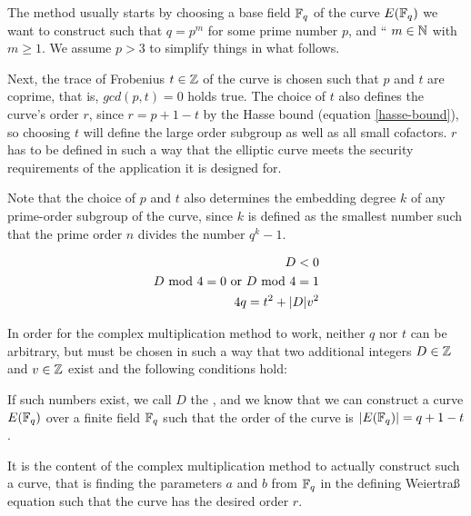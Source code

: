 
The method usually starts by choosing a base field $\mathbb{F}_{q}$ of the curve $E(\mathbb{F}_q)$ we want to construct such that $q = p^m$ for some prime number $p$, and  `` $m\in \mathbb{N}$ with $m\geq 1$. We assume $p>3$ to simplify things in what follows. 

Next, the trace of Frobenius $t\in \mathbb{Z}$ of the curve is chosen such that $p$ and $t$ are coprime, that is, $gcd(p,t)=0$ holds true. The choice of $t$ also defines the curve's order $r$, since $r=p+1-t$ by the Hasse bound (equation \ref{hasse-bound}), so choosing $t$ will define the large order subgroup as well as all small cofactors. $r$ has to be defined in such a way that the elliptic curve meets the security requirements of the application it is designed for. 

Note that the choice of $p$ and $t$ also determines the embedding degree $k$ of any prime-order subgroup of the curve, since $k$ is defined as the smallest number such that the prime order $n$ divides the number $q^k-1$.

\begin{equation}\label{eq:D-criteria}
\begin{split}
D<0\\
D \text{ mod } 4=0 \text{ or } D \text{ mod } 4=1\\
4q  = t^2 + |D|v^2 
\end{split}
\end{equation}

In order for the complex multiplication method to work, neither $q$ nor $t$ can be arbitrary, but must be chosen in such a way that two additional integers $D\in \mathbb{Z}$ and $v\in \mathbb{Z}$ exist and the following conditions hold:


If such numbers exist, we call $D$ the , and we know that we can construct a curve $E(\mathbb{F}_q)$ over a finite field $\mathbb{F}_q$ such that the order of the curve is $|E(\mathbb{F}_q)|= q+1-t$. 

It is the content of the complex multiplication method to actually construct such a curve, that is finding the parameters $a$ and $b$ from $\mathbb{F}_q$ in the defining Weiertraß equation such that the curve has the desired order $r$. 

